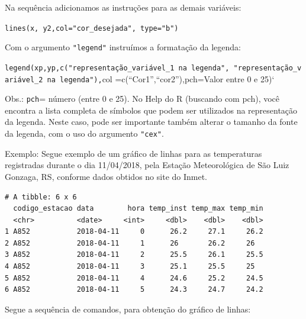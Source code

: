 \documentclass[12pt,brazil,]{book}
\newenvironment{Shaded}{\begin{snugshade}}{\end{snugshade}}
\newcommand{\DataTypeTok}[1]{\textcolor[rgb]{0.13,0.29,0.53}{#1}}
\newcommand{\KeywordTok}[1]{\textcolor[rgb]{0.13,0.29,0.53}{\textbf{#1}}}
\newcommand{\NormalTok}[1]{#1}
\newcommand{\OtherTok}[1]{\textcolor[rgb]{0.56,0.35,0.01}{#1}}
\newcommand{\StringTok}[1]{\textcolor[rgb]{0.31,0.60,0.02}{#1}}
\begin{document}
Na sequência adicionamos as instruções para as demais variáveis:

\texttt{lines(x,\ y2,col="cor\_desejada",\ type="b")}

Com o argumento \texttt{"legend"} instruímos a formatação da legenda:

\texttt{legend(xp,yp,c("representação\_variável\_1\ na\ legenda",\ "representação\_variável\_2\ na\ legenda"),}col
=c(``Cor1'',``cor2''),pch=Valor entre 0 e 25)`

Obs.: \texttt{pch}= número (entre 0 e 25). No Help do R (buscando com
pch), você encontra a lista completa de símbolos que podem ser
utilizados na representação da legenda. Neste caso, pode ser importante
também alterar o tamanho da fonte da legenda, com o uso do argumento
\texttt{"cex"}.

Exemplo: Segue exemplo de um gráfico de linhas para as temperaturas
registradas durante o dia 11/04/2018, pela Estação Meteorológica de São
Luiz Gonzaga, RS, conforme dados obtidos no site do Inmet.

\begin{Shaded}
\end{Shaded}

\begin{verbatim}
# A tibble: 6 x 6
  codigo_estacao data        hora temp_inst temp_max temp_min
  <chr>          <date>     <int>     <dbl>    <dbl>    <dbl>
1 A852           2018-04-11     0      26.2     27.1     26.2
2 A852           2018-04-11     1      26       26.2     26  
3 A852           2018-04-11     2      25.5     26.1     25.5
4 A852           2018-04-11     3      25.1     25.5     25  
5 A852           2018-04-11     4      24.6     25.2     24.5
6 A852           2018-04-11     5      24.3     24.7     24.2
\end{verbatim}

Segue a sequência de comandos, para obtenção do gráfico de linhas:
\end{document}

